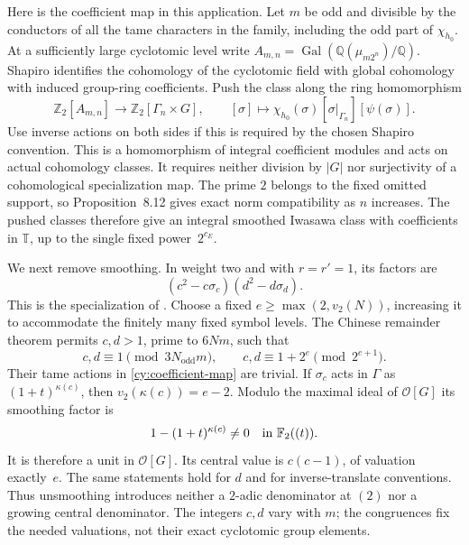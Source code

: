 Here is the coefficient map in this application.  Let $m$ be odd and
divisible by the conductors of all the tame characters in the family,
including the odd part of $\chi_{h_0}$.  At a sufficiently large
cyclotomic level write $A_{m,n}=\operatorname{Gal}(\mathbb Q(\mu_{m2^n})/
\mathbb Q)$.  Shapiro identifies the cohomology of the cyclotomic field
with global cohomology with induced group-ring coefficients.  Push the
class along the ring homomorphism
\begin{equation}\label{cy:coefficient-map}
 \mathbb Z _2[A_{m,n}]\longrightarrow
       \mathbb Z _2[\Gamma_n\times G],\qquad
 [\sigma]\longmapsto
       \chi_{h_0}(\sigma)[\sigma|_{\Gamma_n}][\psi(\sigma)].
\end{equation}
Use inverse actions on both sides if this is required by the chosen
Shapiro convention.  This is a homomorphism of integral coefficient
modules and acts on actual cohomology classes.  It requires neither
division by $|G|$ nor surjectivity of a cohomological specialization map.
The prime $2$ belongs to the fixed omitted support, so Proposition~8.12
gives exact norm compatibility as $n$ increases.  The pushed classes
therefore give an integral smoothed Iwasawa class with coefficients in
$\mathbb T$, up to the single fixed power~$2^{c_E}$.

We next remove smoothing.  In weight two and with $r=r'=1$, its factors
are
\begin{equation}\label{cy:smoothing}
 (c^2-c\sigma_c)(d^2-d\sigma_d).
\end{equation}
This is the specialization of
\cite[Theorem~6.6 and (4.2.4)]{Kato2004}.  Choose a fixed
$e\geq\max(2,v_2(N))$, increasing it to accommodate the finitely many
fixed symbol levels.  The Chinese remainder theorem permits $c,d>1$,
prime to $6Nm$, such that
\[
 c,d\equiv1\pmod{3N_{\mathrm{odd}}m},\qquad
 c,d\equiv1+2^e\pmod{2^{e+1}}.
\]
Their tame actions in \eqref{cy:coefficient-map} are trivial.  If
$\sigma_c$ acts in $\Gamma$ as $(1+t)^{\kappa(c)}$, then
$v_2(\kappa(c))=e-2$.  Modulo the maximal ideal of $\mathcal O[G]$ its
smoothing factor is
\[
 1-(1+t)^{\kappa(c)}\ne0\quad\hbox{in }\mathbb F _2((t)).
\]
It is therefore a unit in $\mathcal O[G]$.  Its central value is
$c(c-1)$, of valuation exactly~$e$.  The same statements hold for $d$
and for inverse-translate conventions.  Thus unsmoothing introduces
neither a $2$-adic denominator at $(2)$ nor a growing central denominator.
The integers $c,d$ vary with $m$; the congruences fix the needed valuations,
not their exact cyclotomic group elements.

